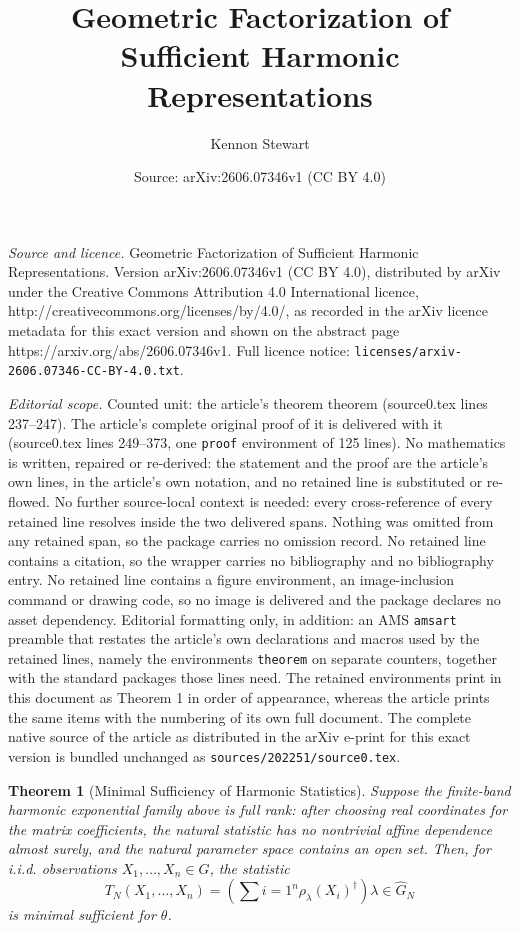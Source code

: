 \documentclass[10pt,a4paper]{amsart}
\title{Geometric Factorization of Sufficient Harmonic Representations}
\author{Kennon Stewart}
\date{Source: arXiv:2606.07346v1 (CC BY 4.0)}
\newtheorem{theorem}{Theorem}
\begin{document}
\maketitle

\noindent\emph{Source and licence.} Geometric Factorization of Sufficient Harmonic Representations. Version arXiv:2606.07346v1 (CC BY 4.0), distributed by arXiv under the Creative Commons Attribution 4.0 International licence, http://creativecommons.org/licenses/by/4.0/, as recorded in the arXiv licence metadata for this exact version and shown on the abstract page https://arxiv.org/abs/2606.07346v1. Full licence notice: \texttt{licenses/arxiv-2606.07346-CC-BY-4.0.txt}.\par\smallskip

\noindent\textit{Editorial scope.} Counted unit: the article's theorem theorem (source0.tex lines 237--247). The article's complete original proof of it is delivered with it (source0.tex lines 249--373, one \texttt{proof} environment of 125 lines). No mathematics is written, repaired or re-derived: the statement and the proof are the article's own lines, in the article's own notation, and no retained line is substituted or re-flowed.  No further source-local context is needed: every cross-reference of every retained line resolves inside the two delivered spans.  Nothing was omitted from any retained span, so the package carries no omission record.  No retained line contains a citation, so the wrapper carries no bibliography and no bibliography entry.  No retained line contains a figure environment, an image-inclusion command or drawing code, so no image is delivered and the package declares no asset dependency.  Editorial formatting only, in addition: an AMS \texttt{amsart} preamble that restates the article's own declarations and macros used by the retained lines, namely the environments \texttt{theorem} on separate counters, together with the standard packages those lines need.  The retained environments print in this document as Theorem 1 in order of appearance, whereas the article prints the same items with the numbering of its own full document.  The complete native source of the article as distributed in the arXiv e-print for this exact version is bundled unchanged as \texttt{sources/202251/source0.tex}.
\begin{theorem}[Minimal Sufficiency of Harmonic Statistics]
Suppose the finite-band harmonic exponential family above is full rank: after choosing real coordinates for the matrix coefficients, the natural statistic has no nontrivial affine dependence almost surely, and the natural parameter space contains an open set. Then, for i.i.d. observations $X_1,\dots,X_n\in G$, the statistic
$$
T_N(X_1,\dots,X_n)
=
\left(
\sum{i=1}^n \rho_\lambda(X_i)^\dagger
\right){\lambda\in\widehat G_N}
$$
is minimal sufficient for $\theta$.
\end{theorem}
\end{document}
